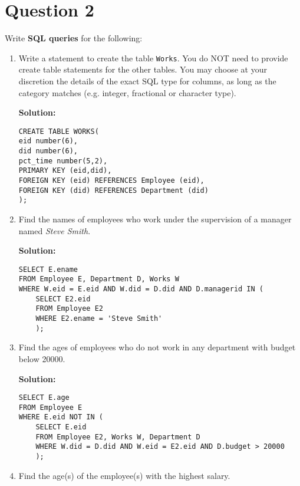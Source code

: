 
\section*{Question 2}

Write \textbf{SQL queries} for the following:

\begin{enumerate}[label=(\alph*)]
\item Write a statement to create the table \texttt{Works}. You do NOT need to provide create table statements for the other tables. You may choose at your discretion the details of the exact SQL type for columns, as long as the category matches (e.g. integer, fractional or character type).

\textbf{Solution:}
\begin{verbatim}
CREATE TABLE WORKS(
eid number(6),
did number(6),
pct_time number(5,2),
PRIMARY KEY (eid,did),
FOREIGN KEY (eid) REFERENCES Employee (eid),
FOREIGN KEY (did) REFERENCES Department (did)
);
\end{verbatim}

\item Find the names of employees who work under the supervision of a manager named \textit{Steve Smith}.

\textbf{Solution:}
\begin{verbatim}
SELECT E.ename
FROM Employee E, Department D, Works W
WHERE W.eid = E.eid AND W.did = D.did AND D.managerid IN (
	SELECT E2.eid
	FROM Employee E2
	WHERE E2.ename = 'Steve Smith'  
	);
\end{verbatim}

\item Find the ages of employees who do not work in any department with budget below 20000.

\textbf{Solution:}
\begin{verbatim}
SELECT E.age
FROM Employee E
WHERE E.eid NOT IN (
	SELECT E.eid
	FROM Employee E2, Works W, Department D
	WHERE W.did = D.did AND W.eid = E2.eid AND D.budget > 20000
	);
\end{verbatim}

\item Find the age(s) of the employee(s) with the highest salary.


\end{enumerate}
